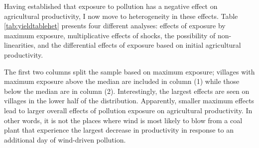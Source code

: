 \documentclass[
]{article}
\begin{document}
Having established that exposure to pollution has a negative effect on agricultural productivity, I now move to heterogeneity in these effects. Table \ref{tab:yieldtablehet} presents four different analyses: effects of exposure by maximum exposure, multiplicative effects of shocks, the possibility of non-linearities, and the differential effects of exposure based on initial agricultural productivity.

The first two columns split the sample based on maximum exposure; villages with maximum exposure above the median are included in column (1) while those below the median are in column (2). Interestingly, the largest effects are seen on villages in the lower half of the distribution. Apparently, smaller maximum effects lead to larger overall effects of pollution exposure on agricultural productivity. In other words, it is not the places where wind is most likely to blow from a coal plant that experience the largest decrease in productivity in response to an additional day of wind-driven pollution.
\end{document}
